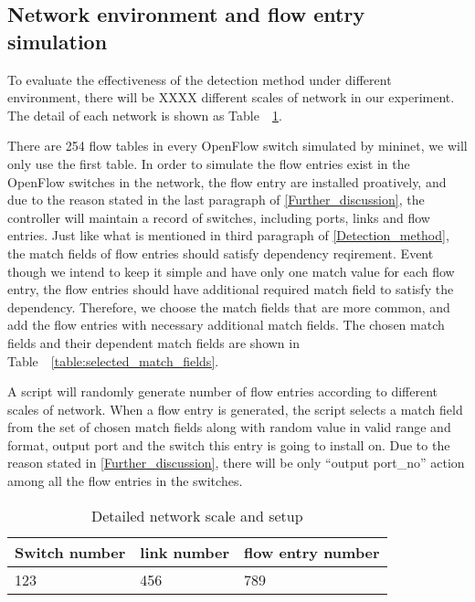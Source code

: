 \subsection{Network environment and flow entry simulation} 
To evaluate the effectiveness of the detection method under different environment, there will be XXXX different scales of network in our experiment. The detail of each network is shown as Table~~\ref{table:network_env}. 

There are 254 flow tables in every OpenFlow switch simulated by mininet, we will only use the first table. In order to simulate the flow entries exist in the OpenFlow switches in the network, the flow entry are installed proatively, and due to the reason stated in the last paragraph of \ref{Further_discussion}, the controller will maintain a record of switches, including ports, links and flow entries. Just like what is mentioned in third paragraph of \ref{Detection_method}, the match fields of flow entries should satisfy dependency reqirement. Event though we intend to keep it simple and have only one match value for each flow entry, the flow entries should have additional required match field to satisfy the dependency. Therefore, we choose the match fields that are more common, and add the flow entries with necessary additional match fields. The chosen match fields and their dependent match fields are shown in Table~~\ref{table:selected_match_fields}.

A script will randomly generate number of flow entries according to different scales of network.
When a flow entry is generated, the script selects a match field from the set of chosen match fields along with random value in valid range and format, output port and the switch this entry is going to install on. Due to the reason stated in \ref{Further_discussion}, there will be only ``output port\_no'' action among all the flow entries in the switches.

\begin{table}[H]
\centering
\caption{Detailed network scale and setup}
\begin{tabular}{|l|p{4cm}|p{4.5cm}|}
\hline  Switch number & link number & flow entry number \\
\hline 123 & 456 & 789	\\
\hline 
\end{tabular}
\label{table:network_env}
\end{table}

